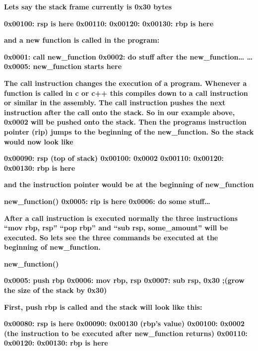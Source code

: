\documentclass[letterpaper]{article}
\begin{document}
\textbf{Lets say the stack frame currently is 0x30 bytes}

\textbf{0x00100: rsp is here\newline
0x00110:\newline
0x00120:\newline
0x00130: rbp is here}

\textbf{and a new function is called in the program:}

\textbf{0x0001: call new\_function\newline
0x0002: do stuff after the new\_function{\dots}\newline
{\dots} 0x0005: new\_function starts here}

\textbf{The call instruction changes the execution of a program. Whenever a function is called in c or c++ this compiles
down to a call instruction or similar in the assembly. The call instruction pushes the next instruction after the call
onto the stack. So in our example above, 0x0002 will be pushed onto the stack. Then the programs instruction pointer
(rip) jumps to the beginning of the new\_function. So the stack would now look like}

\textbf{0x00090: rsp (top of stack)\newline
0x00100: 0x0002\newline
0x00110:\newline
0x00120:\newline
0x00130: rbp is here}

\textbf{and the instruction pointer would be at the beginning of new\_function}

\textbf{new\_function()\newline
0x0005: rip is here\newline
0x0006: do some stuff{\dots}}

\textbf{After a call instruction is executed normally the three instructions ``mov rbp, rsp'' ``pop rbp'' and ``sub rsp,
some\_amount'' will be executed. So lets see the three commands be executed at the beginning of new\_function.}

\textbf{new\_function()}

\textbf{0x0005: push rbp\newline
0x0006: mov rbp, rsp\newline
0x0007: sub rsp, 0x30 ;(grow the size of the stack by 0x30)}

\textbf{First, push rbp is called and the stack will look like this:}

\textbf{0x00080: rsp is here\newline
0x00090: 0x00130 (rbp's value)\newline
0x00100: 0x0002 (the instruction to be executed after new\_function returns)\newline
0x00110:\newline
0x00120:\newline
0x00130: rbp is here}
\end{document}
